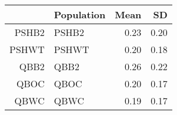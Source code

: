 \begin{tabular}{rlrr}
  \hline
 & Population & Mean & SD \\ 
  \hline
PSHB2 & PSHB2 & 0.23 & 0.20 \\ 
  PSHWT & PSHWT & 0.20 & 0.18 \\ 
  QBB2 & QBB2 & 0.26 & 0.22 \\ 
  QBOC & QBOC & 0.20 & 0.17 \\ 
  QBWC & QBWC & 0.19 & 0.17 \\ 
   \hline
\end{tabular}
